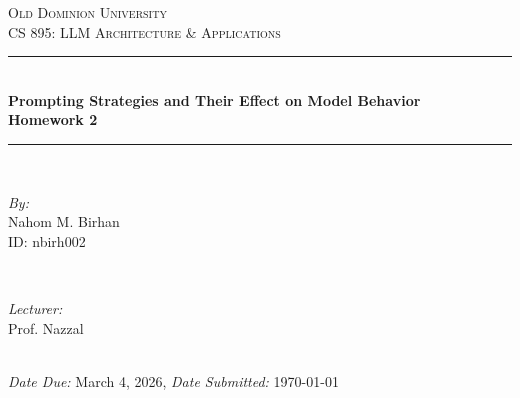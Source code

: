 \begin{titlepage}

    \newcommand{\HRule}{\rule{\linewidth}{0.5mm}} 

    \begin{center}
    
        \textsc{\LARGE Old Dominion University}\\[1.0cm]
        \textsc{\Large CS 895: LLM Architecture \& Applications}\\[0.5cm] 
        \HRule \\[0.1cm]
        { \huge \bfseries Prompting Strategies and Their Effect on Model Behavior}\\[0.3cm] 
        { \Large \bfseries Homework 2}\\[0.3cm] 
        \HRule \\[0.1cm]

      
        \begin{minipage}{0.4\textwidth}
            \begin{flushleft} \large
                \emph{By:} \\
                Nahom M. Birhan \\ 
                ID: nbirh002
            \end{flushleft}
        \end{minipage}
        ~
        \begin{minipage}{0.4\textwidth}
            \begin{flushright} \large
                \emph{Lecturer:} \\
                Prof. Nazzal
            \end{flushright}
        \end{minipage}\\[0.5cm]

        \emph{Date Due:} March 4, 2026, \emph{Date Submitted:} \today \\[1.0cm] 


\end{center}
\end{titlepage}
